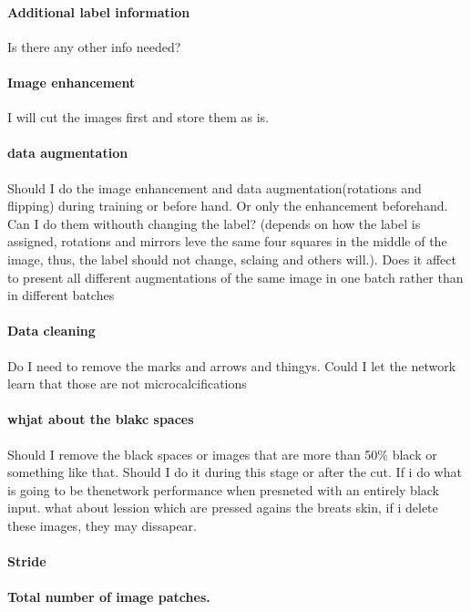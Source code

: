 \paragraph{Additional label information}
Is there any other info needed?

\paragraph{Image enhancement}
I will cut the images first and store them as is.

\paragraph{data augmentation}
Should I do the image enhancement and data augmentation(rotations and flipping) during training or before hand. Or only the enhancement beforehand. Can I do them withouth changing the label? (depends on how the label is assigned, rotations and mirrors leve the same four squares in the middle of the image, thus, the label should not change, sclaing and others will.). Does it affect to present all different augmentations of the same image in one batch rather than in different batches

\paragraph{Data cleaning}
Do I need to remove the marks and arrows and thingys. Could I let the network learn that those are not microcalcifications

\paragraph{whjat about the blakc spaces}
Should I remove the black spaces or images that are more than 50\% black or something like that. Should I do it during this stage or after the cut. If i do what is going to be thenetwork performance when presneted with an entirely black input. what about lession which are pressed agains the breats skin, if i delete these images, they may dissapear.

\paragraph{Stride}
\paragraph{Total number of image patches.}


